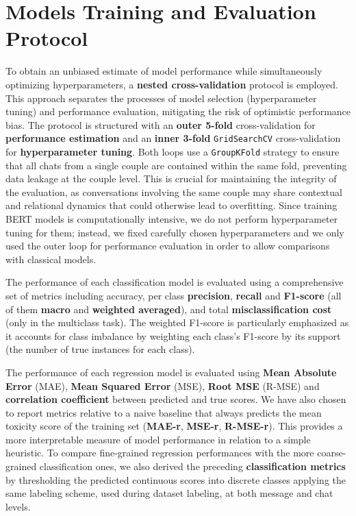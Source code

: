 \documentclass[twocolumn]{ceurart}
\begin{document}
\section{Models Training and Evaluation Protocol}

To obtain an unbiased estimate of model performance while simultaneously optimizing hyperparameters, a \textbf{nested cross-validation} protocol is employed. This approach separates the processes of model selection (hyperparameter tuning) and performance evaluation, mitigating the risk of optimistic performance bias. The protocol is structured with an \textbf{outer 5-fold} cross-validation for \textbf{performance estimation} and an \textbf{inner 3-fold} \texttt{GridSearchCV} cross-validation for \textbf{hyperparameter tuning}. Both loops use a \texttt{GroupKFold} strategy to ensure that all chats from a single couple are contained within the same fold, preventing data leakage at the couple level. This is crucial for maintaining the integrity of the evaluation, as conversations involving the same couple may share contextual and relational dynamics that could otherwise lead to overfitting. Since training BERT models is computationally intensive, we do not perform hyperparameter tuning for them; instead, we fixed carefully chosen hyperparameters and we only used the outer loop for performance evaluation in order to allow comparisons with classical models.

The performance of each classification model is evaluated using a comprehensive set of metrics including accuracy, per class \textbf{precision}, \textbf{recall} and \textbf{F1-score} (all of them \textbf{macro} and \textbf{weighted averaged}), and total \textbf{misclassification cost} (only in the multiclass task). The weighted F1-score is particularly emphasized as it accounts for class imbalance by weighting each class's F1-score by its support (the number of true instances for each class).

The performance of each regression model is evaluated using \textbf{Mean Absolute Error} (MAE), \textbf{Mean Squared Error} (MSE), \textbf{Root MSE} (R-MSE) and \textbf{correlation coefficient} between predicted and true scores. We have also chosen to report metrics relative to a naive baseline that always predicts the mean toxicity score of the training set (\textbf{MAE-r}, \textbf{MSE-r}, \textbf{R-MSE-r}). This provides a more interpretable measure of model performance in relation to a simple heuristic. To compare fine-grained regression performances with the more coarse-grained classification ones, we also derived the preceding \textbf{classification metrics} by thresholding the predicted continuous scores into discrete classes applying the same labeling scheme, used during dataset labeling, at both message and chat levels.
\end{document}
